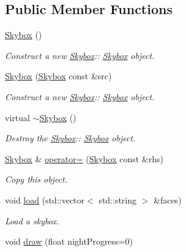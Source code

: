 \subsection*{Public Member Functions}
\begin{DoxyCompactItemize}
\item 
\mbox{\label{class_skybox_a77a92db4492ed94ed4bd101b05ffb1f4}} 
\hyperlink{class_skybox_a77a92db4492ed94ed4bd101b05ffb1f4}{Skybox} ()
\begin{DoxyCompactList}\small\item\em Construct a new \hyperlink{class_skybox}{Skybox}\+:\+: \hyperlink{class_skybox}{Skybox} object. \end{DoxyCompactList}\item 
\hyperlink{class_skybox_a2e839335759ec65f6bc7b0c4d5d294b2}{Skybox} (\hyperlink{class_skybox}{Skybox} const \&src)
\begin{DoxyCompactList}\small\item\em Construct a new \hyperlink{class_skybox}{Skybox}\+:\+: \hyperlink{class_skybox}{Skybox} object. \end{DoxyCompactList}\item 
\mbox{\label{class_skybox_a62ad4c6b4b1965a0a6d8536a50d4c090}} 
virtual \hyperlink{class_skybox_a62ad4c6b4b1965a0a6d8536a50d4c090}{$\sim$\+Skybox} ()
\begin{DoxyCompactList}\small\item\em Destroy the \hyperlink{class_skybox}{Skybox}\+:\+: \hyperlink{class_skybox}{Skybox} object. \end{DoxyCompactList}\item 
\hyperlink{class_skybox}{Skybox} \& \hyperlink{class_skybox_abf01cb7deeb5d0cee173b50c43f82161}{operator=} (\hyperlink{class_skybox}{Skybox} const \&rhs)
\begin{DoxyCompactList}\small\item\em Copy this object. \end{DoxyCompactList}\item 
void \hyperlink{class_skybox_a5ee5403ca72532870de608185481c3ba}{load} (std\+::vector$<$ std\+::string $>$ \&faces)
\begin{DoxyCompactList}\small\item\em Load a skybox. \end{DoxyCompactList}\item 
void \hyperlink{class_skybox_a103d5448a82178e8abaa0ab5fad2c07f}{draw} (float night\+Progress=0)

\end{DoxyCompactItemize}
